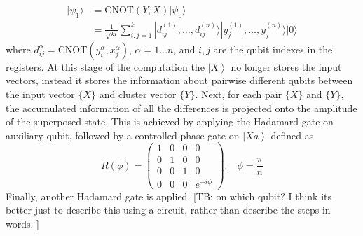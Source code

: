 \documentclass[pra,showkeys,twocolumn,showpacs]{revtex4-1}
\begin{document}
\begin{align}
    | \psi_1 \rangle & = 
    \mathrm{CNOT} (Y,X)| \psi_0 \rangle \nonumber \\
		& =  
    \frac{1}{\sqrt{kl}} \sum_{i, j=1}^{k} 
    | d^{(1)}_{ij}, \dots, d^{(n)}_{ij} \rangle 
    | y^{(1)}_j, \dots, y^{(n)}_j \rangle
    | 0 \rangle 
\end{align}
%
where $d^\alpha_{ij} = \mathrm{CNOT}(y^\alpha_i, x^\alpha_j)$, $\alpha = 1 \dots n$, and $i,j$ are the qubit indexes in the registers. At this stage of the computation the $\left| X \right\rangle$ no longer stores the input vectors, instead it stores the information about pairwise different qubits between the input vector $\{X\}$ and cluster vector $\{Y\}$. Next, for each pair $\{X\}$ and $\{Y\}$, the accumulated information of all the differences is projected onto the amplitude of the superposed state. This is achieved by applying the Hadamard gate on auxiliary qubit, followed by a controlled phase gate on $\left| Xa \right\rangle$ defined as
%
\begin{equation}
    \label{eq:control_phase_rotation}
    R(\phi) = 
    \begin{pmatrix}
        1 & 0 & 0 & 0 \\
        0 & 1 & 0 & 0 \\
        0 & 0 & 1 & 0 \\
        0 & 0 & 0 & e^{-i\phi}
    \end{pmatrix} .
    \quad \phi = \frac{\pi}{n}
\end{equation}
%
Finally, another Hadamard gate is applied. [TB: on which qubit? I think its better just to describe this using a circuit, rather than describe the steps in words. ]
\end{document}
